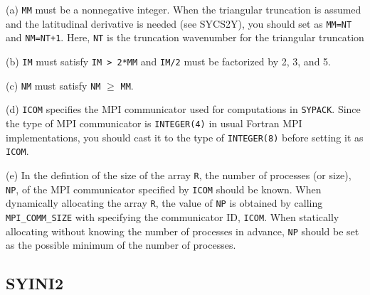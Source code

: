 \documentclass[a4paper]{scrartcl}
\begin{document}
\begin{enumerate}
(a) \texttt{MM} must be a nonnegative integer.
 When the triangular truncation is assumed and
 the latitudinal derivative is needed (see SYCS2Y),
 you should set as \texttt{MM=NT} and \texttt{NM=NT+1}.
 Here, \texttt{NT} is the truncation wavenumber for 
  the triangular truncation
  
(b) \texttt{IM} must satisfy \texttt{IM > 2*MM} and
\texttt{IM/2} must be factorized by 2, 3, and 5.

(c) \texttt{NM} must satisfy 
\texttt{NM} $\ge$ \texttt{MM}.
  
(d) \texttt{ICOM} specifies the MPI communicator used
for computations in \texttt{SYPACK}. Since the type
of MPI communicator is \texttt{INTEGER(4)} in usual
Fortran MPI implementations, you should cast it to
the type of \texttt{INTEGER(8)} before setting it as \texttt{ICOM}.

(e) In the defintion of the size of the array \texttt{R}, the
number of processes (or size), \texttt{NP}, of the MPI communicator specified
by \texttt{ICOM} should be known. When dynamically allocating
the array \texttt{R}, the value of \texttt{NP} is obtained
by calling \texttt{MPI\_COMM\_SIZE} with specifying the communicator
ID, \texttt{ICOM}. When statically allocating without knowing
the number of processes in advance, \texttt{NP} should be set
as the possible minimum of the number of processes.

\end{enumerate}


\subsection{SYINI2}
\end{document}
